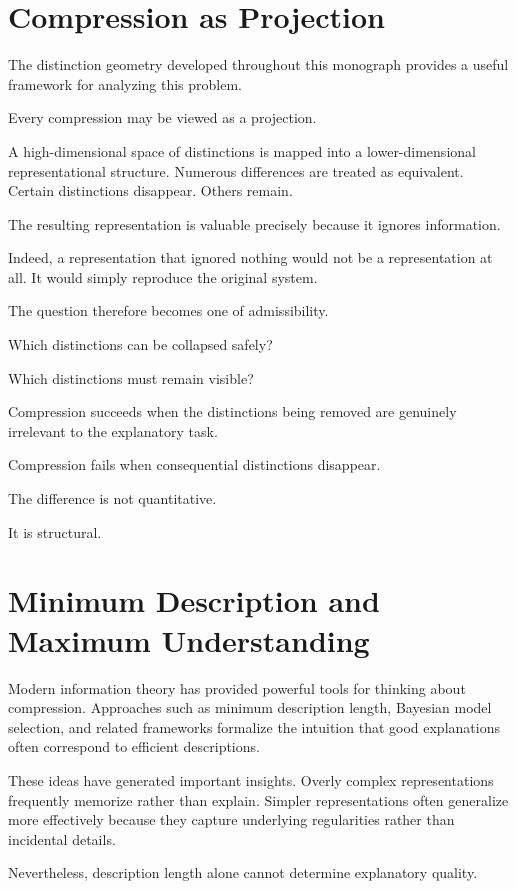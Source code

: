 \documentclass[11pt,oneside,openany]{book}
\begin{document}
\section{Compression as Projection}

The distinction geometry developed throughout this monograph provides a useful framework for analyzing this problem.

Every compression may be viewed as a projection.

A high-dimensional space of distinctions is mapped into a lower-dimensional representational structure. Numerous differences are treated as equivalent. Certain distinctions disappear. Others remain.

The resulting representation is valuable precisely because it ignores information.

Indeed, a representation that ignored nothing would not be a representation at all. It would simply reproduce the original system.

The question therefore becomes one of admissibility.

Which distinctions can be collapsed safely?

Which distinctions must remain visible?

Compression succeeds when the distinctions being removed are genuinely irrelevant to the explanatory task.

Compression fails when consequential distinctions disappear.

The difference is not quantitative.

It is structural.

\section{Minimum Description and Maximum Understanding}

Modern information theory has provided powerful tools for thinking about compression. Approaches such as minimum description length, Bayesian model selection, and related frameworks formalize the intuition that good explanations often correspond to efficient descriptions.

These ideas have generated important insights. Overly complex representations frequently memorize rather than explain. Simpler representations often generalize more effectively because they capture underlying regularities rather than incidental details.

Nevertheless, description length alone cannot determine explanatory quality.
\end{document}

